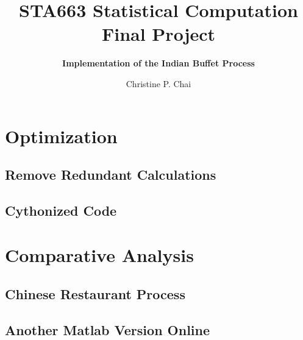\documentclass[12pt]{article}
\begin{document}
\vspace{-1in}
\title{\bf STA663 Statistical Computation Final Project}
\author{\bf Implementation of the Indian Buffet Process}
\date{Christine P. Chai}
\maketitle 
\vspace{-0.5in}







\section{Optimization}

\subsection{Remove Redundant Calculations}

\subsection{Cythonized Code}

\section{Comparative Analysis}

\subsection{Chinese Restaurant Process}

\subsection{Another Matlab Version Online}
\end{document}
